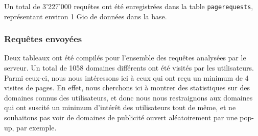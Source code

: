 		Un total de 3'227'000 requêtes ont été enregistrées dans la table \texttt{pagerequests}, représentant environ 1 Gio de données dans la base. 

		\subsubsection{Requêtes envoyées}

			Deux tableaux ont été compilés pour l'ensemble des requêtes analysées par le serveur. Un total de 1058 domaines différents ont été visités par les utilisateurs. Parmi ceux-ci, nous nous intéressons ici à ceux qui ont reçu un minimum de 4 visites de pages. En effet, nous cherchons ici à montrer des statistiques sur des domaines connus des utilisateurs, et donc nous nous restraignons aux domaines qui ont suscité un minimum d'intérêt des utilisateurs tout de même, et ne souhaitons pas voir de domaines de publicité ouvert aléatoirement par une pop-up, par exemple.

